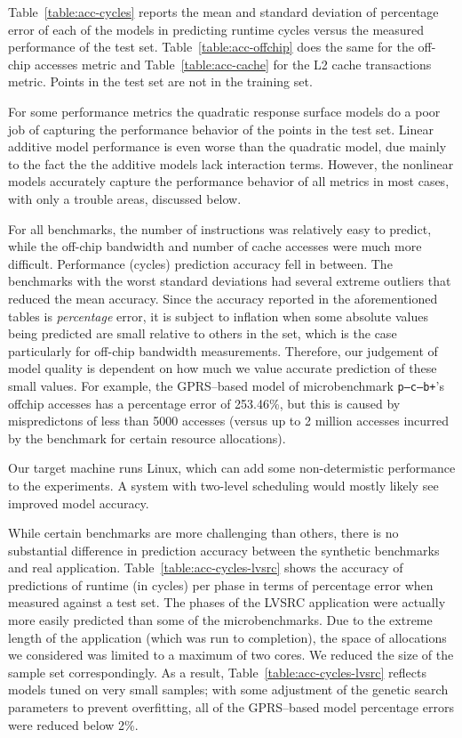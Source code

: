 Table~\ref{table:acc-cycles} reports the mean and standard deviation of percentage error of each of the models in predicting runtime cycles versus the measured performance of the test set. Table~\ref{table:acc-offchip} does the same for the off-chip accesses metric and Table~\ref{table:acc-cache} for the L2 cache transactions metric.  Points in the test set are not in the training set.

For some performance metrics the quadratic response surface models do a poor job of capturing the performance behavior of the points in the test set.  Linear additive model performance is even worse than the quadratic model, due mainly to the fact the the additive models lack interaction terms. However, the nonlinear models accurately capture the performance behavior of all metrics in most cases, with only a trouble areas, discussed below.

For all benchmarks, the number of instructions was relatively easy to predict, while the off-chip bandwidth and number of cache accesses were much more difficult.  Performance (cycles) prediction accuracy fell in between.  The benchmarks with the worst standard deviations had several extreme outliers that reduced the mean accuracy. Since the accuracy reported in the aforementioned tables is {\em percentage} error, it is subject to inflation when some absolute values being predicted are small relative to others in the set, which is the case particularly for off-chip bandwidth measurements.  Therefore, our judgement of model quality is dependent on how much we value accurate prediction of these small values.  For example, the GPRS--based model of microbenchmark {\tt  p--c--b+}'s offchip accesses has a percentage error of 253.46\%, but this is caused by mispredictons of less than 5000 accesses (versus up to 2 million accesses incurred by the benchmark for certain resource allocations).

Our target machine runs Linux, which can add some non-determistic performance to the experiments.  A system with two-level scheduling would mostly likely see improved model accuracy.

While certain benchmarks are more challenging than others, there is no substantial difference in prediction accuracy between the synthetic benchmarks and real application. Table~\ref{table:acc-cycles-lvsrc} shows the accuracy of predictions of runtime (in cycles) per phase in terms of percentage error when measured against a test set.  The phases of the LVSRC application were actually more easily predicted than some of the microbenchmarks.  Due to the extreme length of the application (which was run to completion), the space of allocations we considered was limited to a maximum of two cores.  We reduced the size of the sample set correspondingly.  As a result, Table~\ref{table:acc-cycles-lvsrc} reflects models tuned on very small samples; with some adjustment of the genetic search parameters to prevent overfitting, all of the GPRS--based model percentage errors were reduced below 2\%.

